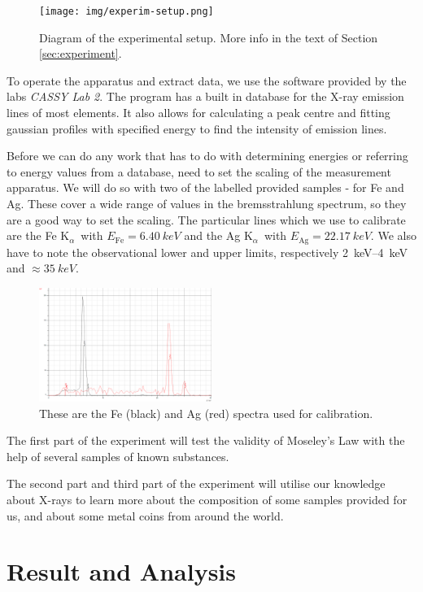 \documentclass[11pt,a4paper,twoside,onecolumn]{article}
\newcommand{\Kalpha}{$\mathrm{K}_\alpha$~}
\begin{document}
\begin{figure}[!htbp]
    \centering
    \texttt{[image: img/experim-setup.png]}
    \caption{Diagram of the experimental setup. More info in the text of Section \ref{sec:experiment}.}\label{fig:experim-setup}
\end{figure}

To operate the apparatus and extract data, we use the software provided by the labs \emph{CASSY Lab 2}. The program has a built in database for the X-ray emission lines of most elements. It also allows for calculating a peak centre and fitting gaussian profiles with specified energy to find the intensity of emission lines.

Before we can do any work that has to do with determining energies or referring to energy values from a database, need to set the scaling of the measurement apparatus. We will do so with two of the labelled provided samples - for Fe and Ag. These cover a wide range of values in the bremsstrahlung spectrum, so they are a good way to set the scaling. The particular lines which we use to calibrate are the Fe \Kalpha with $E_\mathrm{Fe} = \qty{6.40}{keV}$ and the Ag \Kalpha with $E_\mathrm{Ag} = \qty{22.17}{keV}$. We also have to note the observational lower and upper limits, respectively \qtyrange{2}{4}{keV} and $\approx \qty{35}{keV}$.

\begin{figure}[!htbp]
    \centering
    \includegraphics[width=0.5\textwidth]{img/calib.png}
    \caption{These are the Fe (black) and Ag (red) spectra used for calibration.}\label{fig:calibration}
\end{figure}

The first part of the experiment will test the validity of Moseley's Law with the help of several samples of known substances.

The second part and third part of the experiment will utilise our knowledge about X-rays to learn more about the composition of some samples provided for us, and about some metal coins from around the world.

\section{Result and Analysis}
\end{document}

